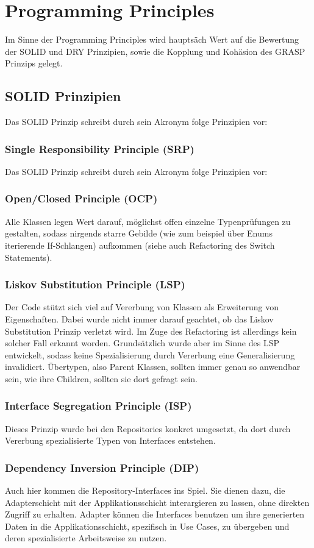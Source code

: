 \chapter{Programming Principles}

Im Sinne der Programming Principles wird hauptsäch Wert auf die Bewertung der SOLID und DRY Prinzipien, sowie die Kopplung und Kohäsion des GRASP Prinzips gelegt.

\section{SOLID Prinzipien}
Das SOLID Prinzip schreibt durch sein Akronym folge Prinzipien vor:
\subsection{Single Responsibility Principle (SRP)}
Das SOLID Prinzip schreibt durch sein Akronym folge Prinzipien vor:
\subsection{Open/Closed Principle (OCP)}
Alle Klassen legen Wert darauf, möglichst offen einzelne Typenprüfungen zu gestalten, sodass nirgends starre Gebilde (wie zum beispiel über Enums iterierende If-Schlangen) aufkommen (siehe auch Refactoring des Switch Statements).
\subsection{Liskov Substitution Principle (LSP)}
Der Code stützt sich viel auf Vererbung von Klassen als Erweiterung von Eigenschaften. Dabei wurde nicht immer darauf geachtet, ob das Liskov Substitution Prinzip verletzt wird. Im Zuge des Refactoring ist allerdings kein solcher Fall erkannt worden. Grundsätzlich wurde aber im Sinne des LSP entwickelt, sodass keine Spezialisierung durch Vererbung eine Generalisierung invalidiert. Übertypen, also Parent Klassen, sollten immer genau so anwendbar sein, wie ihre Children, sollten sie dort gefragt sein.
\subsection{Interface Segregation Principle (ISP)}
Dieses Prinzip wurde bei den Repositories konkret umgesetzt, da dort durch Vererbung spezialisierte Typen von Interfaces entstehen.
\subsection{Dependency Inversion Principle (DIP)}
Auch hier kommen die Repository-Interfaces ins Spiel. Sie dienen dazu, die Adapterschicht mit der Applikationsschicht interargieren zu lassen, ohne direkten Zugriff zu erhalten. Adapter können die Interfaces benutzen um ihre generierten Daten in die Applikationsschicht, spezifisch in Use Cases, zu übergeben und deren spezialisierte Arbeitsweise zu nutzen.

